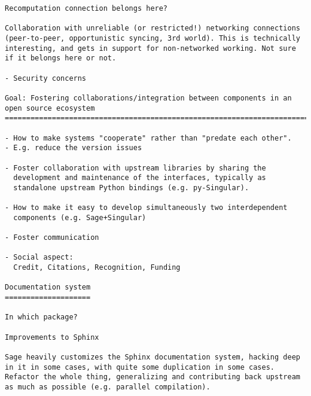 \begin{Workpackage}{\thewpno}
\begin{verbatim}
Recomputation connection belongs here?

Collaboration with unreliable (or restricted!) networking connections
(peer-to-peer, opportunistic syncing, 3rd world). This is technically
interesting, and gets in support for non-networked working. Not sure
if it belongs here or not.

- Security concerns

Goal: Fostering collaborations/integration between components in an open source ecosystem
=============================================================================

- How to make systems "cooperate" rather than "predate each other".
- E.g. reduce the version issues

- Foster collaboration with upstream libraries by sharing the
  development and maintenance of the interfaces, typically as
  standalone upstream Python bindings (e.g. py-Singular).

- How to make it easy to develop simultaneously two interdependent
  components (e.g. Sage+Singular)

- Foster communication

- Social aspect:
  Credit, Citations, Recognition, Funding

Documentation system
====================

In which package?

Improvements to Sphinx

Sage heavily customizes the Sphinx documentation system, hacking deep
in it in some cases, with quite some duplication in some cases.
Refactor the whole thing, generalizing and contributing back upstream
as much as possible (e.g. parallel compilation).
\end{verbatim}

\end{Workpackage}
